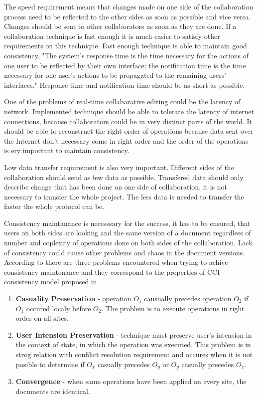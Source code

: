 \documentclass[12pt,oneside]{fithesis2}
\begin{document}
\par The speed requirement means that changes made on one side of the collaboration process need to be reflected to the other sides as soon as possible and vice versa. Changes should be sent to other collaborators as soon as they are done. If a collaboration technique is fast enough it is much easier to satisfy other requirements on this technique. Fast enough technique is able to maintain good consistency. "The system’s response time is the time necessary for the actions of one user to be reflected by their own interface; the notification time is the time necessary for one user’s actions to be propagated to the remaining users’ interfaces." \cite{Ellis} Response time and notification time should be as short as possible.  \par One of the problems of real-time collabarative editing could be the latency of network. Implemented technique should be able to tolerate the latency of internet connections, because collaborators could be in very distinct parts of the world. It should be able to reconstruct the right order of operations because data sent over the Internet don't necessary come in right order and the order of the operations is ery important to maintain consistency.\par Low data transfer requirement is also very important. Different sides of the collaboration should send as few data as possible. Transfered data should only describe change that has been done on one side of collaboration, it is not necessary to transfer the whole project. The less data is needed to transfer the faster the whole protocol can be.  \par Consistency maintanance is necesssary for the success, it has to be ensured, that users on both sides are looking and the same version of a document regardless of number and coplexity of operations done on both sides of the collaboration. Lack of consistency could cause other problems and chaos in the document versions. According to \cite{Vidot} there are three problems encountered when trying to achive consistency maintenance and they correspond to the properties of CCI consistency model proposed in \cite{Sun}
\begin{enumerate}
\item \textbf{Casuality Preservation} - operation \(O_{1}\) causually precedes operation \(O_{2}\) if \(O_{1}\) occured localy before \(O_{2}\). The problem is to execute operations in right order on all sites.
\item \textbf{User Intension Preservation} - technique must preserve user's intension in the context of state, in which the operation was executed. This problem is in strog relation with confilict resolution requirement and occures when it is not posible to determine if \(O_{x}\) casually precedes \(O_{y}\) or \(O_{y}\) casually precedes \(O_{x}\).
\item \textbf{Convergence} - when same operations have been applied on every site, the documents are identical.
\end{enumerate}
\end{document}
